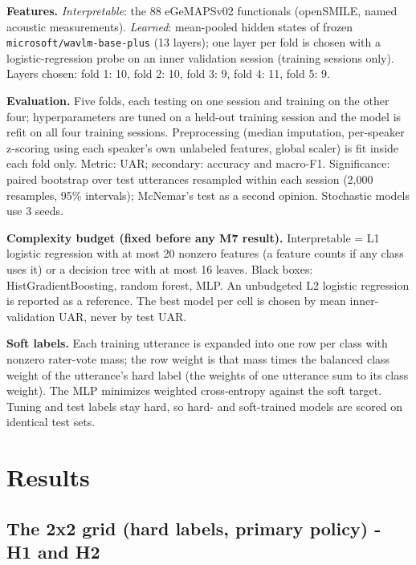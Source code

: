 \documentclass[11pt]{article}
\begin{document}
\textbf{Features.} \emph{Interpretable}: the 88 eGeMAPSv02 functionals (openSMILE, named acoustic measurements). \emph{Learned}: mean-pooled hidden states of frozen \texttt{microsoft/wavlm-base-plus} (13 layers); one layer per fold is chosen with a logistic-regression probe on an inner validation session (training sessions only). Layers chosen: fold 1: 10, fold 2: 10, fold 3: 9, fold 4: 11, fold 5: 9.

\textbf{Evaluation.} Five folds, each testing on one session and training on the other four; hyperparameters are tuned on a held-out training session and the model is refit on all four training sessions. Preprocessing (median imputation, per-speaker z-scoring using each speaker's own unlabeled features, global scaler) is fit inside each fold only. Metric: UAR; secondary: accuracy and macro-F1. Significance: paired bootstrap over test utterances resampled within each session (2,000 resamples, 95\% intervals); McNemar's test as a second opinion. Stochastic models use 3 seeds.

\textbf{Complexity budget (fixed before any M7 result).} Interpretable = L1 logistic regression with at most 20 nonzero features (a feature counts if any class uses it) or a decision tree with at most 16 leaves. Black boxes: HistGradientBoosting, random forest, MLP. An unbudgeted L2 logistic regression is reported as a reference. The best model per cell is chosen by mean inner-validation UAR, never by test UAR.

\textbf{Soft labels.} Each training utterance is expanded into one row per class with nonzero rater-vote mass; the row weight is that mass times the balanced class weight of the utterance's hard label (the weights of one utterance sum to its class weight). The MLP minimizes weighted cross-entropy against the soft target. Tuning and test labels stay hard, so hard- and soft-trained models are scored on identical test sets.

\section{Results}\label{results}

\subsection{The 2x2 grid (hard labels, primary policy) - H1 and H2}\label{the-2x2-grid-hard-labels-primary-policy---h1-and-h2}
\end{document}
